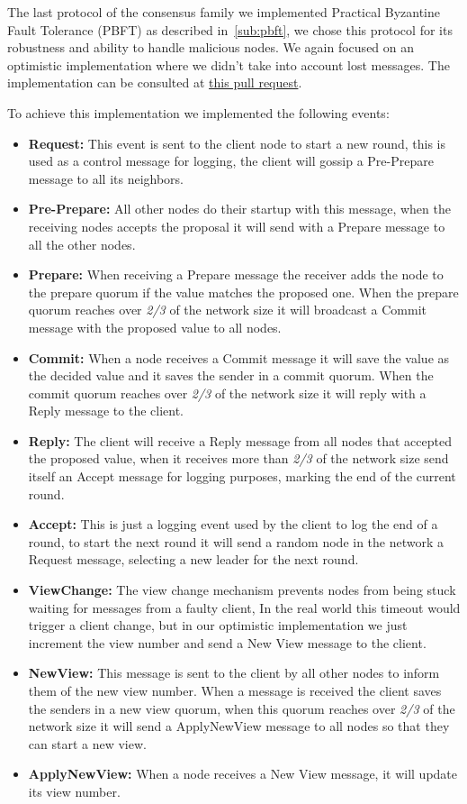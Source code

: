 The last protocol of the consensus family we implemented Practical Byzantine Fault Tolerance (PBFT) as described
in~\ref{sub:pbft}, we chose this protocol for its robustness and ability to handle malicious nodes.
We again focused on an optimistic implementation where we didn't take into account lost messages.
The implementation can be consulted at \href{https://github.com/RMLoureiro/MOBS/pull/6}{this pull request}.

To achieve this implementation we implemented the following events:
\begin{itemize}
	\item \textbf{Request: } This event is sent to the client node to start a new round, this is used
	as a control message for logging, the client will gossip a Pre-Prepare message to all its neighbors.
	\item \textbf{Pre-Prepare: } All other nodes do their startup with this message,
	when the receiving nodes accepts the proposal it will send with a Prepare message to all the other nodes.
	\item \textbf{Prepare: } When receiving a Prepare message  the receiver
	adds the node to the prepare quorum if the value matches the proposed one.
	When the prepare quorum reaches over \textit{2/3} of the network size it will
	broadcast a Commit message with the proposed value to all nodes.
	\item \textbf{Commit: } When a node receives a Commit message it will save the value as the decided value and it saves
	the sender in a commit quorum. When the commit quorum reaches over \textit{2/3} of the network size it will
	reply with a Reply message to the client.
	\item \textbf{Reply: } The client will receive a Reply message from all nodes that accepted the proposed value,
	when it receives more than \textit{2/3} of the network size send itself an Accept message for logging purposes, marking the end of
	the current round.
	\item \textbf{Accept: } This is just a logging event used by the client to log the end of a round, to start the next round
	it will send a random node in the network a Request message, selecting a new leader for the next round.
	\item \textbf{ViewChange: }	The view change mechanism prevents nodes from being stuck waiting for messages from a faulty client,
  In the real world this timeout would trigger a client change, but in our optimistic implementation we just increment the view number
	and send a New View message to the client.
	\item \textbf{NewView: } This message is sent to the client by all other nodes to inform them of the new view number. When a message
	is received the client saves the senders in a new view quorum, when this quorum reaches over \textit{2/3} of the network size
	it will send a ApplyNewView message to all nodes so that they can start a new view.
	\item \textbf{ApplyNewView: } When a node receives a New View message, it will update its view number.
\end{itemize}

